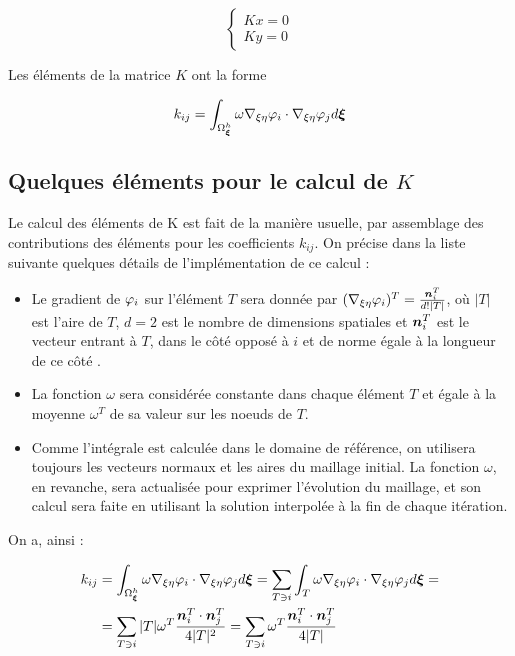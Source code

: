 \begin{equation}
	\label{eq:syst_final}
	\begin{cases}
		Kx = 0 \\
		Ky = 0
	\end{cases}
\end{equation}

\indent Les éléments de la matrice \(K\) ont la forme

\begin{equation}
  k_{ij} = \int_{\Omega_{\boldsymbol{\xi}}^h}{ \omega \nabla_{\xi\eta} \varphi_i \cdot \nabla_{\xi\eta} \varphi_j  d\boldsymbol{\xi}}
\end{equation}


\subsection{Quelques éléments pour le calcul de \(K\)}
\label{subsec:calculK}

\indent Le calcul des éléments de K est fait de la manière usuelle, par assemblage des contributions des éléments pour les coefficients \(k_{ij}\). On précise dans la liste suivante quelques détails de l'implémentation de ce calcul : 

\begin{itemize}
	\item Le gradient de \(\varphi_i\) sur l'élément \(T\) sera donnée par \((\nabla_{\xi\eta} \varphi_i)^T = \frac{\boldsymbol{n}_i^T}{d!|T|}\), où \(|T|\) est l'aire de \(T\), \(d=2\) est le nombre de dimensions spatiales et \(\boldsymbol{n}_i^T\) est le vecteur entrant à \(T\), dans le côté opposé à \(i\) et de norme égale à la longueur de ce côté \cite{vecNormal}.
	\item La fonction \(\omega\) sera considérée constante dans chaque élément \(T\) et égale à la moyenne \(\omega^T\) de sa valeur sur les noeuds de \(T\).
	\item Comme l'intégrale est calculée dans le domaine de référence, on utilisera toujours les vecteurs normaux et les aires du maillage initial. La fonction \(\omega\), en revanche, sera actualisée pour exprimer l'évolution du maillage, et son calcul sera faite en utilisant la solution interpolée à la fin de chaque itération.
\end{itemize}

\indent On a, ainsi : 

\begin{equation}
\label{eq:calculK_2d}
\begin{gathered}
\begin{aligned}
	k_{ij} & = \int_{\Omega_{\boldsymbol{\xi}}^h}{ \omega \nabla_{\xi\eta} \varphi_i  \cdot \nabla_{\xi\eta} \varphi_j  d\boldsymbol{\xi}} = \sum_{T \ni i} {\int_{T}{ \omega \nabla_{\xi\eta} \varphi_i \cdot \nabla_{\xi\eta} \varphi_j  d\boldsymbol{\xi}}} = \\
	       &  = \sum_{T \ni i}
	              { 
	                     { |T|\omega^T \frac{\boldsymbol{n}_i^T\cdot \boldsymbol{n}_j^T}{4|T|^2}
	                     }
	              }
	          = \sum_{T \ni i}
	              { 
	                     { \omega^T \frac{\boldsymbol{n}_i^T\cdot \boldsymbol{n}_j^T}{4|T|}
	                     }
	              }	              
\end{aligned}
\end{gathered}
\end{equation}

